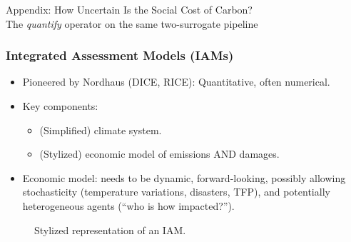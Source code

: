 \documentclass[10pt,aspectratio=169]{beamer}
\begin{document}
{
\begin{frame}
\Huge \textcolor{uzhblue}{Appendix: How Uncertain Is the Social Cost of Carbon?}\\[0.5em]
{\normalsize \textcolor{uzhblue}{The \emph{quantify} operator on the same two-surrogate pipeline}}
\end{frame}}

\begin{frame}
\frametitle{Integrated Assessment Models (IAMs)}
\begin{itemize}
\item Pioneered by Nordhaus (DICE, RICE): Quantitative, often numerical.
\item Key components:
\begin{itemize}
    \item (Simplified) climate system.
    \item (Stylized) economic model of emissions AND damages.
\end{itemize}
\item Economic model: needs to be dynamic, forward-looking, possibly allowing stochasticity (temperature variations, disasters, TFP), and potentially heterogeneous agents (``who is how impacted?'').
\end{itemize}
\vfill
\begin{figure}[h]
\centering
{}
\caption{Stylized representation of an IAM.}
\label{fig:IAM_stylized}
\end{figure}
\end{frame}
\end{document}
